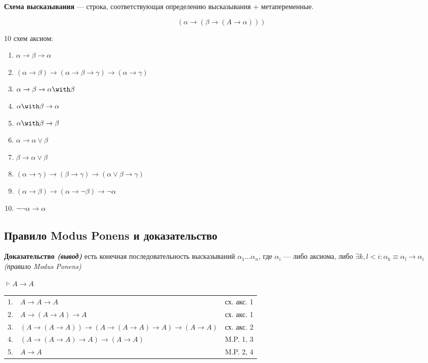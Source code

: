 \documentclass[12pt, a4paper, oneside]{book}
\begin{document}
\begin{definition}
    \textbf{Схема высказывания} --- строка, соответствующая определению высказывания + метапеременные.
\end{definition}

\begin{example}
    \[(\alpha \to (\beta \to (A \to \alpha)))\]
\end{example}

10 схем аксиом:
\begin{enumerate}
    \item \(\alpha \to \beta \to \alpha\)
    \item \((\alpha \to \beta) \to (\alpha \to \beta \to \gamma) \to (\alpha \to \gamma)\)
    \item \(\alpha \to \beta \to \alpha \with \beta\)
    \item \(\alpha \with \beta \to \alpha\)
    \item \(\alpha \with \beta \to \beta\)
    \item \(\alpha \to \alpha \lor \beta\)
    \item \(\beta \to \alpha \lor \beta\)
    \item \((\alpha \to \gamma) \to (\beta \to \gamma) \to (\alpha \lor \beta \to \gamma)\)
    \item \((\alpha \to \beta) \to (\alpha \to \neg \beta) \to \neg \alpha\)
    \item \(\neg \neg \alpha \to \alpha\)
\end{enumerate}

\subsection{Правило Modus Ponens и доказательство}

\begin{definition}
    \textbf{Доказательство \textit{(вывод)}} есть конечная последовательность высказываний \(\alpha_1 \dots \alpha_n\), где \(\alpha_i\) --- либо аксиома, либо \(\exists k, l < i : \alpha_k \equiv \alpha_l \to \alpha_i\) \textit{(правило Modus Ponens)}
\end{definition}

\begin{example}
    \(\vdash A \to A\)

    \begin{tabular}{lll}
        1. & \(A \to A \to A\)                                               & сх. акс. 1 \\
        2. & \(A \to (A \to A) \to A\)                                       & сх. акс. 1 \\
        3. & \((A \to (A \to A)) \to (A \to (A \to A) \to A) \to (A \to A)\) & сх. акс. 2 \\
        4. & \((A \to (A \to A) \to A) \to (A \to A)\)                       & M.P. 1, 3  \\
        5. & \(A \to A\)                                                     & M.P. 2, 4
    \end{tabular}
\end{example}
\end{document}
